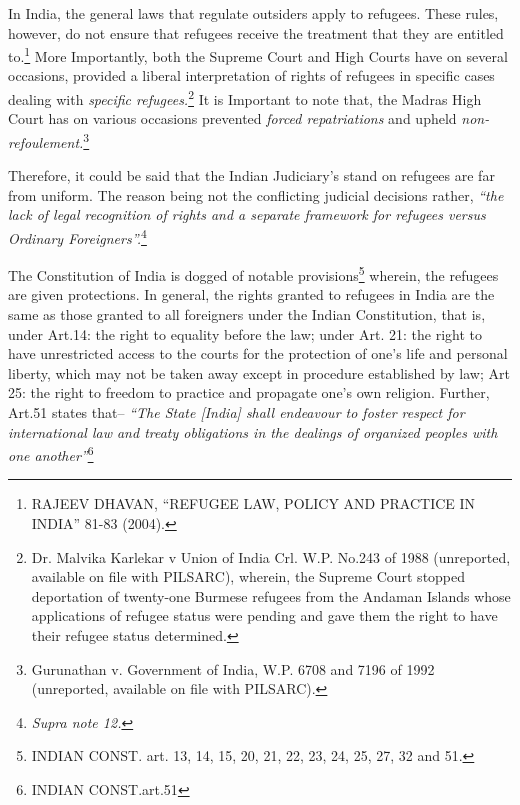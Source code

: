 \begin{multicols}{2}
\vspace{-.1cm}

\noi
In India, the general laws that regulate outsiders apply to refugees. These rules, however, do
not ensure that refugees receive the treatment that they are entitled to.\footnote{RAJEEV DHAVAN, “REFUGEE LAW, POLICY AND PRACTICE IN INDIA” 81-83 (2004).} More Importantly,
both the Supreme Court and High Courts have on several occasions, provided a liberal
interpretation of rights of refugees in specific cases dealing with \textit{specific refugees.}\footnote{Dr. Malvika Karlekar v Union of India Crl. W.P. No.243 of 1988 (unreported, available on file with PILSARC), wherein, the Supreme Court stopped deportation of twenty-one Burmese refugees from the Andaman Islands whose applications of refugee status were pending and gave them the right to
have their refugee status determined.} It is Important to note that, the Madras High Court has on various occasions prevented \textit{forced repatriations} and upheld \textit{non-refoulement.}\footnote{Gurunathan v. Government of India, W.P. 6708 and 7196 of 1992 (unreported, available on file with PILSARC).}

\vspace{-.1cm}

\noi
Therefore, it could be said that the Indian Judiciary’s stand on refugees are far from uniform.
The reason being not the conflicting judicial decisions rather, \textit{“the lack of legal recognition of
rights and a separate framework for refugees versus Ordinary Foreigners”.}\footnote{\textit{Supra note 12.}}

\vspace{-.2cm}


\vspace{-.2cm}

\noi
The Constitution of India is dogged of notable provisions\footnote{INDIAN CONST. art. 13, 14, 15, 20, 21, 22, 23, 24, 25, 27, 32 and 51.} wherein, the refugees are given protections. In general, the rights granted to refugees in India are the same as those granted to
all foreigners under the Indian Constitution, that is, under Art.14: the right to equality before
the law; under Art. 21: the right to have unrestricted access to the courts for the protection of
one's life and personal liberty, which may not be taken away except in procedure established
by law; Art 25: the right to freedom to practice and propagate one’s own religion. Further,
Art.51 states that– \textit{“The State [India] shall endeavour to foster respect for international law
and treaty obligations in the dealings of organized peoples with one another”}\footnote{INDIAN CONST.art.51}


\end{multicols}
